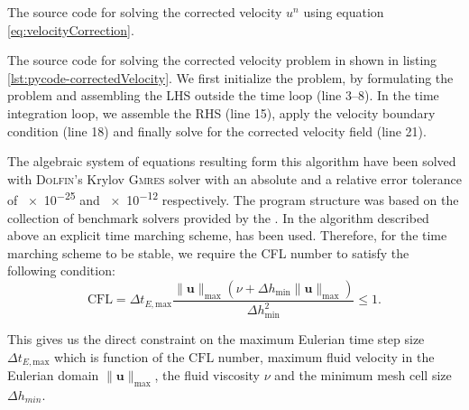 \begin{enumerate}
		\begin{listing}[!t]
		\inputminted[fontseries=courier,obeytabs,fontsize=\scriptsize,mathescape,linenos,numbersep=5pt,frame=lines,framesep=2mm,xleftmargin=20mm,xrightmargin=20mm]{python}{figures/eulerian/correctedVelocity.py}
		\caption{The source code for solving the corrected velocity $u^n$ using equation 		\ref{eq:velocityCorrection}.}
		\label{lst:pycode-correctedVelocity}
		\end{listing}	
	
	The source code for solving the corrected velocity problem in shown in listing \ref{lst:pycode-correctedVelocity}. We first initialize the problem, by formulating the problem and assembling the LHS outside the time loop (line \numrange{3}{8}). In the time integration loop, we assemble the RHS (line 15), apply the velocity boundary condition (line 18) and finally solve for the corrected velocity field (line 21).

	\end{enumerate}
	
The algebraic system of equations resulting form this algorithm have been solved with \textsc{Dolfin}'s Krylov \textsc{Gmres} solver with an absolute and a relative error tolerance of \num{e-25} and \num{e-12} respectively. The program structure was based on the collection of benchmark solvers provided by the \fenics \cite{nsbench}. In the  algorithm described above an explicit time marching scheme,  has been used. Therefore, for the time marching scheme to be stable, we require the CFL number to satisfy the following condition:
	\begin{equation}
	\mathrm{CFL} = \Delta t_{E,\mathrm{max}} \frac{\lVert\mathbf{u}\rVert_{\mathrm{max}}(\nu +  \Delta h_{\mathrm{min}}\lVert\mathbf{u}\rVert_{\mathrm{max}})}{\Delta h_{\mathrm{min}}^2} \leqslant 1.
	\label{eq:cfl}
	\end{equation}
	
This gives us the direct constraint on the maximum Eulerian time step size $\Delta t_{E,\mathrm{max}}$ which is function of the $\mathrm{CFL}$ number, maximum fluid velocity in the Eulerian domain $\lVert \mathbf{u} \rVert_{\mathrm{max}}$, the fluid viscosity $\nu$ and the minimum mesh cell size $\Delta h_{min}$. 


